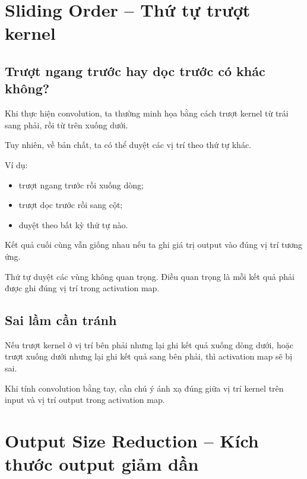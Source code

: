 \section{Sliding Order -- Thứ tự trượt kernel}

\subsection{Trượt ngang trước hay dọc trước có khác không?}

Khi thực hiện convolution, ta thường minh họa bằng cách trượt kernel từ trái sang phải, rồi từ trên xuống dưới.

Tuy nhiên, về bản chất, ta có thể duyệt các vị trí theo thứ tự khác.

Ví dụ:

\begin{itemize}
    \item trượt ngang trước rồi xuống dòng;
    \item trượt dọc trước rồi sang cột;
    \item duyệt theo bất kỳ thứ tự nào.
\end{itemize}

Kết quả cuối cùng vẫn giống nhau nếu ta ghi giá trị output vào đúng vị trí tương ứng.

\begin{ghinho}
Thứ tự duyệt các vùng không quan trọng. Điều quan trọng là mỗi kết quả phải được ghi đúng vị trí trong activation map.
\end{ghinho}

\subsection{Sai lầm cần tránh}

Nếu trượt kernel ở vị trí bên phải nhưng lại ghi kết quả xuống dòng dưới, hoặc trượt xuống dưới nhưng lại ghi kết quả sang bên phải, thì activation map sẽ bị sai.

\begin{canhbao}
Khi tính convolution bằng tay, cần chú ý ánh xạ đúng giữa vị trí kernel trên input và vị trí output trong activation map.
\end{canhbao}

\section{Output Size Reduction -- Kích thước output giảm dần}

